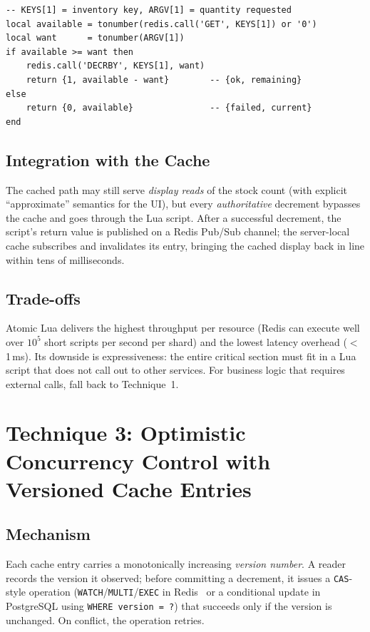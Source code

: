 \documentclass[12pt,a4paper,oneside]{report}
\begin{document}
\begin{lstlisting}[language={[5.2]Lua}, caption=Atomic conditional decrement (Lua / Redis)]
-- KEYS[1] = inventory key, ARGV[1] = quantity requested
local available = tonumber(redis.call('GET', KEYS[1]) or '0')
local want      = tonumber(ARGV[1])
if available >= want then
    redis.call('DECRBY', KEYS[1], want)
    return {1, available - want}        -- {ok, remaining}
else
    return {0, available}               -- {failed, current}
end
\end{lstlisting}

\subsection{Integration with the Cache}
The cached path may still serve \emph{display reads} of the stock count (with explicit ``approximate'' semantics for the UI), but every \emph{authoritative} decrement bypasses the cache and goes through the Lua script. After a successful decrement, the script's return value is published on a Redis Pub/Sub channel; the server-local cache subscribes and invalidates its entry, bringing the cached display back in line within tens of milliseconds.

\subsection{Trade-offs}
Atomic Lua delivers the highest throughput per resource (Redis can execute well over $10^5$ short scripts per second per shard) and the lowest latency overhead ($<$1\,ms). Its downside is expressiveness: the entire critical section must fit in a Lua script that does not call out to other services. For business logic that requires external calls, fall back to Technique~1.

\section[Technique 3: OCC with Versioned Cache]{Technique 3: Optimistic Concurrency Control with Versioned Cache Entries}

\subsection{Mechanism}
Each cache entry carries a monotonically increasing \emph{version number}. A reader records the version it observed; before committing a decrement, it issues a \texttt{CAS}-style operation (\texttt{WATCH}/\texttt{MULTI}/\texttt{EXEC} in Redis~\cite{redis2024inventory} or a conditional update in PostgreSQL using \texttt{WHERE version = ?}) that succeeds only if the version is unchanged. On conflict, the operation retries.
\end{document}
